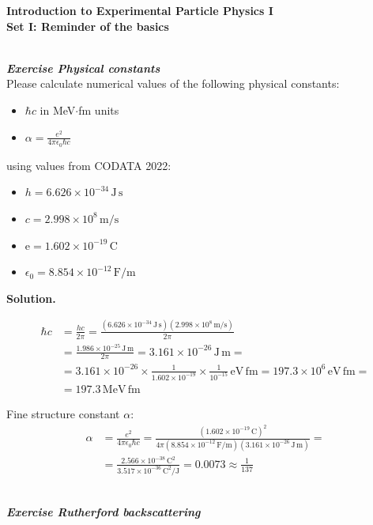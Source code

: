 \documentclass[11pt,a4paper]{article}
\newcounter{zadanie}\newcommand{\zadanie}[1][]{\addtocounter{zadanie}{1} ~\\  {\bf \emph{Exercise \arabic{zadanie} #1 }} \\}
\newenvironment{solution}{\vspace{1cm} \par\textbf{Solution.} \vspace{1cm}}{\newpage}
\begin{document}
         

\begin{centering}
  {\bf {\Large
 Introduction to Experimental Particle Physics I \\
  Set I: Reminder of the basics
  }} \\  
\end{centering}

\vspace{1cm}
\zadanie[Physical constants]

Please calculate numerical values of the following physical constants:
\begin{itemize}
\item $\hbar c$ in MeV$\cdot$fm units    
\item $\alpha = \frac{e^{2}}{4 \pi \epsilon_0 \hbar c}$
\end{itemize} 

\vspace{0.2cm}

using values from CODATA 2022:
\begin{itemize}
\item $h = 6.626 \times 10^{-34}\,\mathrm{J\,s}$
\item $c = 2.998 \times 10^8\,\mathrm{m/s}$
\item $\mathrm{e} = 1.602 \times 10^{-19}\,\mathrm{C}$
\item $\epsilon_0 = 8.854 \times 10^{-12}\,\mathrm{F/m}$
\end{itemize}

\begin{solution}

\begin{align*}
\hbar c &= \frac{h c}{2\pi} = \frac{(6.626 \times 10^{-34}\,\mathrm{J\,s})(2.998 \times 10^8\,\mathrm{m/s})}{2\pi} \\
&= \frac{1.986 \times 10^{-25}\,\mathrm{J\,m}}{2\pi} = 3.161 \times 10^{-26}\,\mathrm{J\,m} = \\
&= 3.161 \times 10^{-26} \times \frac{1}{1.602 \times 10^{-19}} \times \frac{1}{10^{-15}}  \,\mathrm{eV\,fm} = 197.3 \times 10^{6}\,\mathrm{eV\,fm} = \\
& = 197.3\,\mathrm{MeV\,fm}
\end{align*}


Fine structure constant $\alpha$:
\begin{align*}
\alpha &= \frac{e^{2}}{4 \pi \epsilon_0 \hbar c} = \frac{(1.602 \times 10^{-19}\,\mathrm{C})^{2}}{4 \pi (8.854 \times 10^{-
12}\,\mathrm{F/m}) (3.161 \times 10^{-26}\,\mathrm{J\,m})} = \\
&= \frac{2.566 \times 10^{-38}\,\mathrm{C^{2}}}{3.517 \times 10^{-36}\,\mathrm{C^{2}/J} } = 0.0073 \approx \frac{1}{137}
\end{align*}


\end{solution}
\zadanie[Rutherford backscattering]
\end{document}
